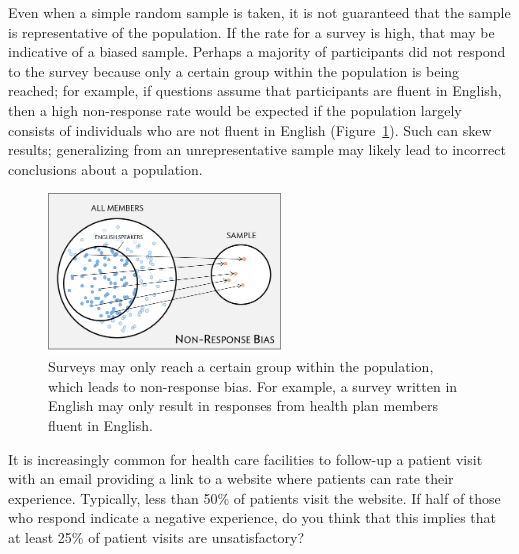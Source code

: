 Even when a simple random sample is taken, it is not guaranteed that the sample is representative of the population. If the  rate  for a survey is high, that may be indicative of a biased sample. Perhaps a majority of participants did not respond to the survey because only a certain group within the population is being reached; for example, if questions assume that participants are fluent in English, then a high non-response rate would be expected if the population largely consists of individuals who are not fluent in English 
(Figure~\ref{sampleNonResponseHealthPlan}). Such   can skew results; generalizing from an unrepresentative sample may likely lead to incorrect conclusions about a population. 

\begin{figure}[h]
	\centering
	{\includegraphics[width=0.55\textwidth]{ch_intro_to_data_oi_biostat/figures/sampleHealthPlan/sampleNonResponseHealthPlan.png}
	\caption{Surveys may only reach a certain group within the population, which leads to non-response bias. For example, a survey written in English may only result in responses from health plan members fluent in English.}
	\label{sampleNonResponseHealthPlan}}
\end{figure}

\begin{exercisewrap}
\begin{nexercise}
It is increasingly common for health care facilities to follow-up a patient visit with an email providing a link to a website where patients can rate their experience.  Typically, less than 50\% of patients visit the website. If half of those who respond indicate a negative experience, do you think that this implies that at least 25\% of patient visits are unsatisfactory?\footnotemark{}
\end{nexercise}
\end{exercisewrap}

